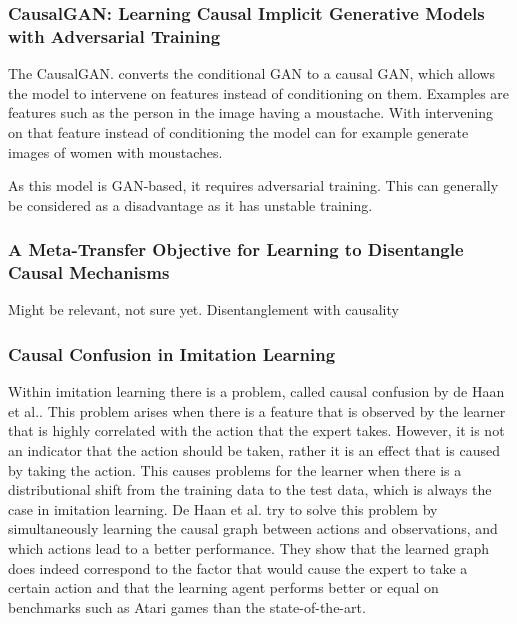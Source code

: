 \documentclass{article}
\begin{document}
\subsubsection*{CausalGAN: Learning Causal Implicit Generative Models with Adversarial Training}
The CausalGAN\cite{kocaoglu2017causalgan}. converts the conditional GAN to a causal GAN, which allows the model to intervene on features instead of conditioning on them. Examples are features such as the person in the image having a moustache. With intervening on that feature instead of conditioning the model can for example generate images of women with moustaches.

As this model is GAN-based, it requires adversarial training. This can generally be considered as a disadvantage as it has unstable training. 

\subsubsection*{A Meta-Transfer Objective for Learning to Disentangle Causal Mechanisms}
Might be relevant, not sure yet.
Disentanglement with causality \cite{Bengio2020A}

\subsubsection*{Causal Confusion in Imitation Learning}
Within imitation learning\cite{torabi2019recent} there is a problem, called causal confusion by de Haan et al.\cite{de2019causal}. This problem arises when there is a feature that is observed by the learner that is highly correlated with the action that the expert takes. However, it is not an indicator that the action should be taken, rather it is an effect that is caused by taking the action. This causes problems for the learner when there is a distributional shift from the training data to the test data, which is always the case in imitation learning. De Haan et al. try to solve this problem by simultaneously learning the causal graph between actions and observations, and which actions lead to a better performance. They show that the learned graph does indeed correspond to the factor that would cause the expert to take a certain action and that the learning agent performs better or equal on benchmarks such as Atari games than the state-of-the-art. 

\end{document}
